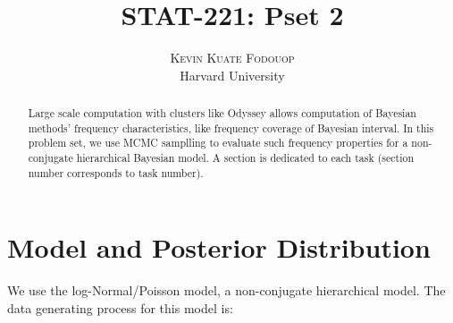 \documentclass[twoside]{article}
\title{\vspace{-15mm}\fontsize{24pt}{10pt}\selectfont\textbf{STAT-221: Pset 2}} %
\author{
\large
\textsc{Kevin Kuate Fodouop}\\ %
\normalsize Harvard University \\ %
\vspace{-5mm}
}
\date{}
\begin{document}
\maketitle %

\thispagestyle{fancy} %


\begin{abstract}
Large scale computation with clusters like Odyssey allows computation of Bayesian methods' frequency characteristics, like frequency coverage of Bayesian interval. In this problem set, we use MCMC samplling to evaluate such frequency properties for a non-conjugate hierarchical Bayesian model. A section is dedicated to each task (section number corresponds to task number).

\end{abstract}



\section{Model and Posterior Distribution}

We use the log-Normal/Poisson model, a non-conjugate hierarchical model. The data generating process for this model is:
\end{document}
